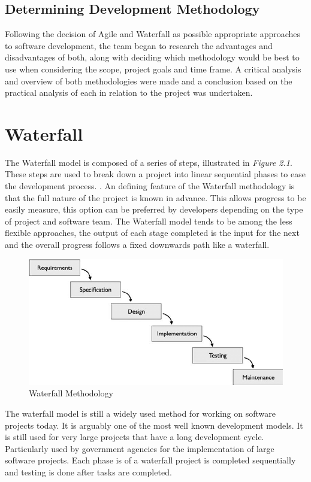 \subsection{Determining Development Methodology}
Following the decision of Agile and Waterfall as possible appropriate approaches to software development, the team began to research the advantages and disadvantages of both, along with deciding which methodology would be best to use when considering the scope, project goals and time frame. A critical analysis and overview of both methodologies were made and a conclusion based on the practical analysis of each in relation to the project was undertaken.

\section{Waterfall}
The Waterfall model is composed of a series of steps, illustrated in \emph{Figure 2.1}. These steps are used to break down a project into linear sequential phases to ease the development process.  \cite{petersen2009waterfall}. An defining feature of the Waterfall methodology is that the full nature of the project is known in advance. This allows progress to be easily measure, this option can be preferred by developers depending on the type of project and software team. The Waterfall model tends to be among the less flexible approaches, the output of each stage completed is the input for the next and the overall progress follows a fixed downwards path like a waterfall.
\begin{figure}[ht]
    \centering
    \includegraphics[scale=0.46]{img/Waterfall.png}
    \caption{Waterfall Methodology}
    \label{fig:my_label1}
\end{figure}
The waterfall model is still a widely used method for working on software projects today. It is arguably one of the most well known development models. It is still used for very large projects that have a long development cycle. Particularly used by government agencies for the implementation of large software projects.
Each phase is of a waterfall project is completed sequentially and testing is done after tasks are completed. \cite{balaji2012waterfall}

